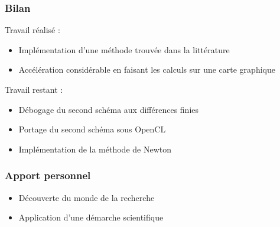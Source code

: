 \documentclass[10pt]{beamer}
\begin{document}
    \begin{frame}
    \frametitle{Bilan}

Travail réalisé :
    \begin{itemize}
    \item Implémentation d'une méthode trouvée dans la littérature \\

    \item Accélération considérable en faisant les calculs sur une carte graphique

    \end{itemize}
\bigskip
Travail restant :
    \begin{itemize}
    \item Débogage du second schéma aux différences finies \\

    \item Portage du second schéma sous OpenCL \\

    \item Implémentation de la méthode de Newton \\


    \end{itemize}
    \end{frame}

    \begin{frame}
    \frametitle{Apport personnel}

    \begin{itemize}
    \item Découverte du monde de la recherche \\

    \item Application d'une démarche scientifique \\


    \end{itemize}

    \end{frame}


    
\end{document}
